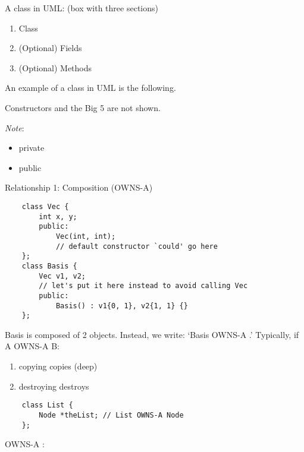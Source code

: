 A class in UML\@: (box with three sections)
\begin{enumerate}[label=(\arabic*)]
    \item Class
    \item (Optional) Fields
    \item (Optional) Methods
\end{enumerate}
An example of a class in UML is the following.
\begin{figure}[H]
    \centering
\end{figure}
Constructors and the Big 5 are not shown.

\emph{Note}:
\begin{itemize}
    \item \code{-} \textrightarrow{} private
    \item \code{+} \textrightarrow{} public
\end{itemize}

Relationship 1: Composition (OWNS-A)
\begin{lstlisting}
    class Vec {
        int x, y;
        public:
            Vec(int, int);
            // default constructor `could' go here
    };
    class Basis {
        Vec v1, v2;
        // let's put it here instead to avoid calling Vec
        public:
            Basis() : v1{0, 1}, v2{1, 1} {}
    };
\end{lstlisting}

Basis is composed of 2  objects. Instead, we write:
`Basis OWNS-A .' Typically, if A OWNS-A B\@:
\begin{enumerate}[label=(\arabic*)]
    \item copying  copies  (deep)
    \item destroying  destroys 
\end{enumerate}

\begin{lstlisting}
    class List {
        Node *theList; // List OWNS-A Node
    };
\end{lstlisting}

 OWNS-A :

\begin{figure}[H]
    \centering
\end{figure}

